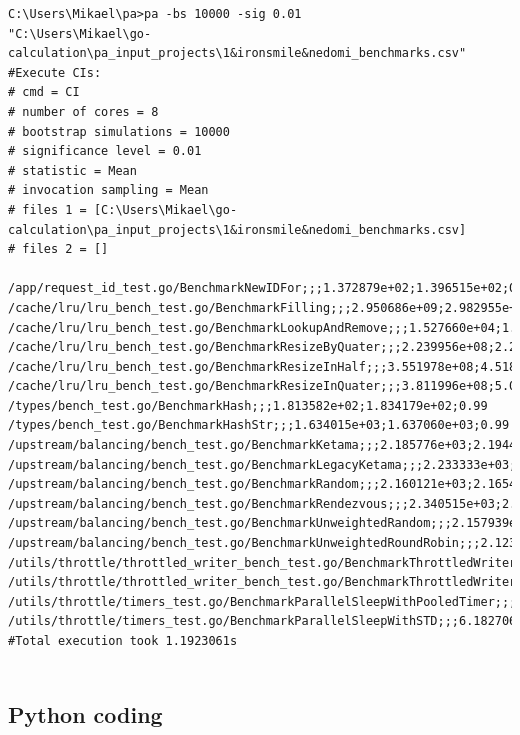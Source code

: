 \documentclass{seal_thesis}
\begin{document}
\begin{lstlisting}[caption=Example pa-tool results of \cite{ironsmile/nedomi}., label={lst:patool}, frame=single, breaklines=true, basicstyle=\small]
C:\Users\Mikael\pa>pa -bs 10000 -sig 0.01
"C:\Users\Mikael\go-calculation\pa_input_projects\1&ironsmile&nedomi_benchmarks.csv"
#Execute CIs:
# cmd = CI
# number of cores = 8
# bootstrap simulations = 10000
# significance level = 0.01
# statistic = Mean
# invocation sampling = Mean
# files 1 = [C:\Users\Mikael\go-calculation\pa_input_projects\1&ironsmile&nedomi_benchmarks.csv]
# files 2 = []

/app/request_id_test.go/BenchmarkNewIDFor;;;1.372879e+02;1.396515e+02;0.99
/cache/lru/lru_bench_test.go/BenchmarkFilling;;;2.950686e+09;2.982955e+09;0.99
/cache/lru/lru_bench_test.go/BenchmarkLookupAndRemove;;;1.527660e+04;1.532752e+04;0.99
/cache/lru/lru_bench_test.go/BenchmarkResizeByQuater;;;2.239956e+08;2.292164e+08;0.99
/cache/lru/lru_bench_test.go/BenchmarkResizeInHalf;;;3.551978e+08;4.518111e+08;0.99
/cache/lru/lru_bench_test.go/BenchmarkResizeInQuater;;;3.811996e+08;5.008146e+08;0.99
/types/bench_test.go/BenchmarkHash;;;1.813582e+02;1.834179e+02;0.99
/types/bench_test.go/BenchmarkHashStr;;;1.634015e+03;1.637060e+03;0.99
/upstream/balancing/bench_test.go/BenchmarkKetama;;;2.185776e+03;2.194403e+03;0.99
/upstream/balancing/bench_test.go/BenchmarkLegacyKetama;;;2.233333e+03;2.242545e+03;0.99
/upstream/balancing/bench_test.go/BenchmarkRandom;;;2.160121e+03;2.165439e+03;0.99
/upstream/balancing/bench_test.go/BenchmarkRendezvous;;;2.340515e+03;2.347833e+03;0.99
/upstream/balancing/bench_test.go/BenchmarkUnweightedRandom;;;2.157939e+03;2.164152e+03;0.99
/upstream/balancing/bench_test.go/BenchmarkUnweightedRoundRobin;;;2.123652e+03;2.130727e+03;0.99
/utils/throttle/throttled_writer_bench_test.go/BenchmarkThrottledWriter;;;4.030817e+09;4.036552e+09;0.99
/utils/throttle/throttled_writer_bench_test.go/BenchmarkThrottledWriterWithReadFrom;;;4.038926e+09;4.040731e+09;0.99
/utils/throttle/timers_test.go/BenchmarkParallelSleepWithPooledTimer;;;6.253588e+07;6.261951e+07;0.99
/utils/throttle/timers_test.go/BenchmarkParallelSleepWithSTD;;;6.182706e+07;6.191619e+07;0.99
#Total execution took 1.1923061s
	
\end{lstlisting}


\subsection{Python coding}
\label{Python coding}
\end{document}
